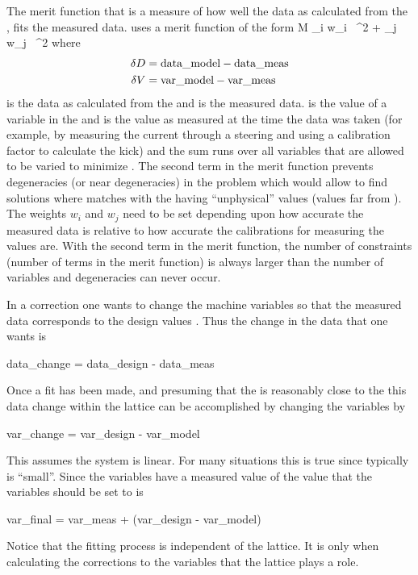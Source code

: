 The merit function  that is a measure of how well the data as calculated from the
, fits the measured data. \tao uses a merit function of the form
\Begineq
  {\cal M} \equiv 
    \sum_{i} w_i \, ^2 + 
    \sum_{j} w_j \, ^2
  \label{m1}
\Endeq
where
\begin{align}
  \delta D &= {\mbox{data}}\_{\mbox{model}} - {\mbox{data}}\_{\mbox{meas}} \nonumber \\
  \delta V &= {\mbox{var}}\_{\mbox{model}}  - {\mbox{var}}\_{\mbox{meas}}
  \label{dd1}
\end{align}
 is the data as calculated from the  and  is the
measured data.  is the value of a variable in the  and
 is the value as measured at the time the data was taken (for example, by
measuring the current through a steering and using a calibration factor to calculate the
kick) and the sum  runs over all variables that are allowed to be varied to minimize
. The second term in the merit function prevents degeneracies (or near
degeneracies) in the problem which would allow \tao to find solutions where
 matches  with the  having ``unphysical''
values (values far from ). The weights $w_i$ and $w_j$ need to be set
depending upon how accurate the measured data is relative to how accurate the calibrations
for measuring the  values are. With the second term in the merit function,
the number of constraints (number of terms in the merit function) is always larger than
the number of variables and degeneracies can never occur.

In a correction one wants to change the machine variables so that the
measured data corresponds to the design values . Thus
the change in the data that one wants is
\begin{example}
  data_change = data_design - data_meas
\end{example}
Once a fit has been made, and presuming that the  is
reasonably close to the  this data change within the
 lattice can be accomplished by changing the variables by
\begin{example}
  var_change = var_design - var_model
\end{example}
This assumes the system is linear. For many situations this is true
since typically  is ``small''. Since the variables have
a measured value of  the value that the variables should
be set to is
\begin{example}
  var_final = var_meas + (var_design - var_model)
\end{example}
Notice that the fitting process is independent of the 
lattice. It is only when calculating the corrections to the
variables that the  lattice plays a role. 

